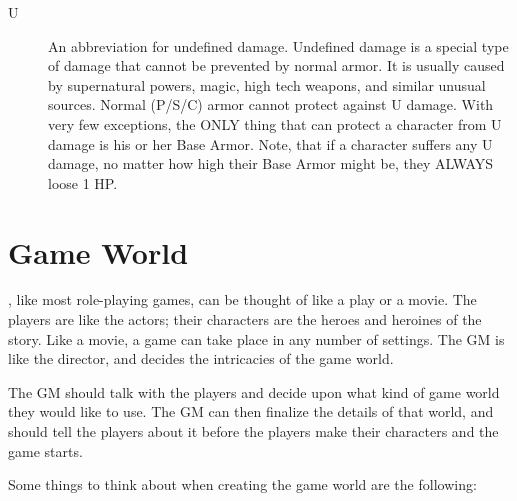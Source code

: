 \documentclass[twoside]{book}
\begin{document}
\begin{description}
{    }
  
  \item[ U ] 
    {  
      An abbreviation for undefined damage. Undefined
                 damage is a special type of damage that cannot be
                 prevented by normal armor. It is usually caused by
                 supernatural powers, magic, high tech weapons, and
                 similar unusual sources. Normal (P/S/C) armor cannot
                 protect against U damage. With very few exceptions, the
                 ONLY thing that can protect a character from U damage is
                 his or her Base Armor. Note, that if a character suffers
                 any U damage, no matter how high their Base Armor might
                 be, they ALWAYS loose 1 HP. 
    }
  
\end{description}
  
    

\section{Game World}
    
    {  
    \APATHY{}, like most role-playing games, can be
            thought of like a play or a movie. The players are like the
            actors; their characters are the heroes and heroines of the
            story. Like a movie, a game can take place in any number of
            settings. The GM is like the director, and decides the
            intricacies of the game world.
          
    }
  
    {  
     The GM should talk with the players and decide upon
             what kind of game world they would like to use. The GM can
             then finalize the details of that world, and should tell the
             players about it before the players make their characters
             and the game starts. 
    }
  
    {  
     Some things to think about when creating the game
             world are the following: 
    }
  
\end{document}
